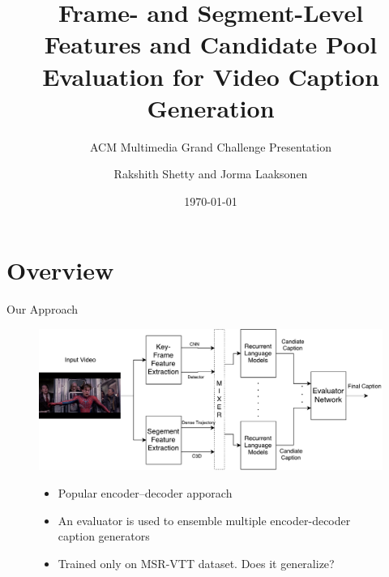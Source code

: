 \documentclass{beamer}
\begin{document}

\title{Frame- and Segment-Level Features and Candidate Pool Evaluation for Video Caption Generation}
\subtitle{ACM Multimedia Grand Challenge Presentation}
\author[Rakshith Shetty and Jorma Laaksonen]{Rakshith Shetty and Jorma Laaksonen}
\date{\today}

\frame{\titlepage} 


\section{Overview}
\begin{frame}{Our Approach}
\begin{figure}[h]
    \centering
    \includegraphics[width=1.0\textwidth]{images/MMGC_Overview.pdf}
\begin{itemize}
    \item Popular encoder--decoder apporach
    \item An evaluator is used to ensemble multiple encoder-decoder caption generators 
    \item Trained only on MSR-VTT dataset. Does it generalize? 
\end{itemize}
\end{figure}
\end{frame}
\end{document}
